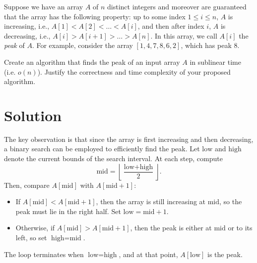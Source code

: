 \documentclass[11pt]{article}
\begin{document}
    \setlength{\headheight}{26pt}
    \pagestyle{fancy}
    \fancyfoot[C]{}
    \fancyfoot[R]{\thepage}
    \renewcommand{\headrulewidth}{0.4pt}
    \renewcommand{\footrulewidth}{0.4 pt}
    
	
    
    \begin{tcolorbox}[title={Problem 1 (Divide and Conquer the Peak, 30 pts)}]
        Suppose we have an array $A$ of $n$ distinct integers and moreover are guaranteed that the array has the following property: up to some index $1\leq i \leq n$, $A$ is increasing, i.e., $A[1] < A[2] < \ldots < A[i]$, and then after index $i$, $A$ is decreasing, i.e., $A[i] > A[i+1] > \ldots > A[n]$. In this array, we call $A[i]$ the \emph{peak} of $A$. For example, consider the array $[1, 4, 7, 8, 6, 2]$, which has peak $8$. 
        \medskip
        
        Create an algorithm that finds the peak of an input array $A$ in sublinear time (i.e. $o(n)$). Justify the correctness and time complexity of your proposed algorithm.
    \end{tcolorbox}
    \section*{Solution}
    The key observation is that since the array is first increasing and then decreasing, a binary search can be employed to efficiently find the peak. Let \( \text{low} \) and \( \text{high} \) denote the current bounds of the search interval. At each step, compute
    \[
    \text{mid} = \left\lfloor \frac{\text{low} + \text{high}}{2} \right\rfloor.
    \]
    Then, compare \( A[\text{mid}] \) with \( A[\text{mid}+1] \):
    \begin{itemize}
        \item If \( A[\text{mid}] < A[\text{mid}+1] \), then the array is still increasing at \( \text{mid} \), so the peak must lie in the right half. Set \( \text{low} = \text{mid} + 1 \).
        \item Otherwise, if \( A[\text{mid}] > A[\text{mid}+1] \), then the peak is either at \( \text{mid} \) or to its left, so set \( \text{high} = \text{mid} \).
    \end{itemize}
    The loop terminates when \( \text{low} = \text{high} \), and at that point, \( A[\text{low}] \) is the peak.
    
\end{document}
